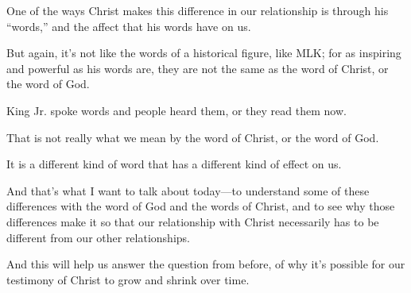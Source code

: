 \begin{compactitem}
			\item One of the ways Christ makes this difference in our relationship is through his ``words,'' and the affect that his words have on us.
				\begin{compactitem}
					\item But again, it's not like the words of a historical figure, like MLK; for as inspiring and powerful as his words are, they are not the same as the word of Christ, or the word of God.
					\item King Jr. spoke words and people heard them, or they read them now.
					\item That is not really what we mean by the word of Christ, or the word of God. 
					\item It is a different kind of word that has a different kind of effect on us.
					\item And that's what I want to talk about today---to understand some of these differences with the word of God and the words of Christ, and to see why those differences make it so that our relationship with Christ necessarily has to be different from our other relationships.
					\item And this will help us answer the question from before, of why it's possible for our testimony of Christ to grow and shrink over time.
				\end{compactitem}
				

\end{compactitem}
